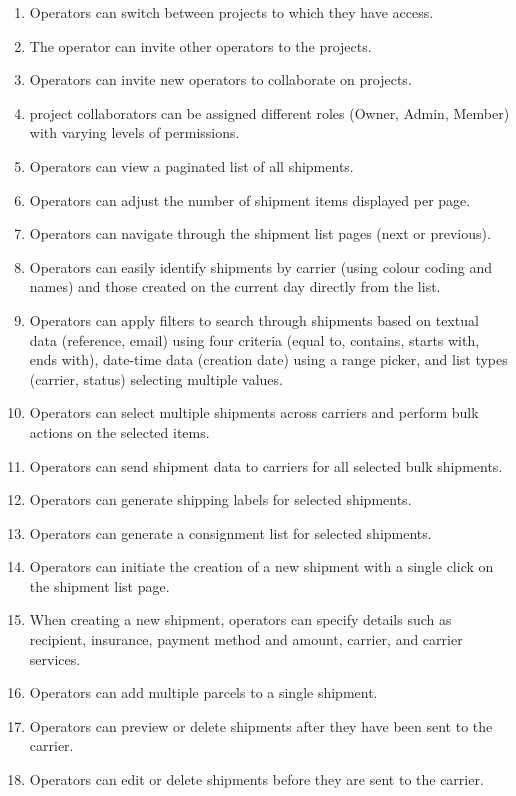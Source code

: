 \begin{enumerate}[label=\bfseries FR\arabic*:,leftmargin=*]
    \item Operators can switch between \glspl{project} to which they have access.
    \item The operator can invite other operators to the \glspl{project}.
    \item Operators can invite new operators to collaborate on \glspl{project}.
    \item \Gls{project} collaborators can be assigned different roles (Owner, Admin, Member) with varying levels of permissions.
    \item Operators can view a paginated list of all shipments.
    \item Operators can adjust the number of shipment items displayed per page.
    \item Operators can navigate through the shipment list pages (next or previous).
    \item Operators can easily identify shipments by carrier (using colour coding and names) and those created on the current day directly from the list.
    \item Operators can apply filters to search through shipments based on textual data (reference, email) using four criteria (equal to, contains, starts with, ends with), date-time data (creation date) using a range picker, and list types (carrier, status) selecting multiple values.
    \item Operators can select multiple shipments across carriers and perform bulk actions on the selected items.
    \item Operators can send shipment data to carriers for all selected bulk shipments.
    \item Operators can generate shipping labels for selected shipments.
    \item Operators can generate a consignment list for selected shipments.
    \item Operators can initiate the creation of a new shipment with a single click on the shipment list page.
    \item When creating a new shipment, operators can specify details such as recipient, insurance, payment method and amount, carrier, and carrier services.
    \item Operators can add multiple parcels to a single shipment.
    \item Operators can preview or delete shipments after they have been sent to the carrier.
    \item Operators can edit or delete shipments before they are sent to the carrier.

\end{enumerate}
